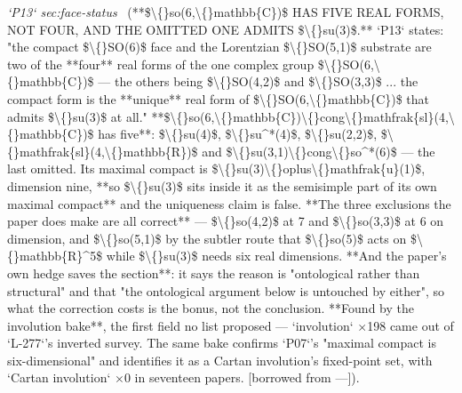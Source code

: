 \begin{description}
\textit{`P13` sec:face-status} \ (**\$\textbackslash\{\}so(6,\textbackslash\{\}mathbb\{C\})\$ HAS FIVE REAL FORMS, NOT FOUR, AND THE OMITTED ONE ADMITS \$\textbackslash\{\}su(3)\$.** `P13` states: "the compact \$\textbackslash\{\}SO(6)\$ face and the Lorentzian \$\textbackslash\{\}SO(5,1)\$ substrate are two of the **four** real forms of the one complex group \$\textbackslash\{\}SO(6,\textbackslash\{\}mathbb\{C\})\$ --- the others being \$\textbackslash\{\}SO(4,2)\$ and \$\textbackslash\{\}SO(3,3)\$ ... the compact form is the **unique** real form of \$\textbackslash\{\}SO(6,\textbackslash\{\}mathbb\{C\})\$ that admits \$\textbackslash\{\}su(3)\$ at all." **\$\textbackslash\{\}so(6,\textbackslash\{\}mathbb\{C\})\textbackslash\{\}cong\textbackslash\{\}mathfrak\{sl\}(4,\textbackslash\{\}mathbb\{C\})\$ has five**: \$\textbackslash\{\}su(4)\$, \$\textbackslash\{\}su\textasciicircum{}*(4)\$, \$\textbackslash\{\}su(2,2)\$, \$\textbackslash\{\}mathfrak\{sl\}(4,\textbackslash\{\}mathbb\{R\})\$ and \$\textbackslash\{\}su(3,1)\textbackslash\{\}cong\textbackslash\{\}so\textasciicircum{}*(6)\$ --- the last omitted. Its maximal compact is \$\textbackslash\{\}su(3)\textbackslash\{\}oplus\textbackslash\{\}mathfrak\{u\}(1)\$, dimension nine, **so \$\textbackslash\{\}su(3)\$ sits inside it as the semisimple part of its own maximal compact** and the uniqueness claim is false. **The three exclusions the paper does make are all correct** --- \$\textbackslash\{\}so(4,2)\$ at 7 and \$\textbackslash\{\}so(3,3)\$ at 6 on dimension, and \$\textbackslash\{\}so(5,1)\$ by the subtler route that \$\textbackslash\{\}so(5)\$ acts on \$\textbackslash\{\}mathbb\{R\}\textasciicircum{}5\$ while \$\textbackslash\{\}su(3)\$ needs six real dimensions. **And the paper's own hedge saves the section**: it says the reason is "ontological rather than structural" and that "the ontological argument below is untouched by either", so what the correction costs is the bonus, not the conclusion. **Found by the involution bake**, the first field no list proposed --- `involution` \ensuremath{\times}198 came out of `L-277`'s inverted survey. The same bake confirms `P07`'s "maximal compact is six-dimensional" and identifies it as a Cartan involution's fixed-point set, with `Cartan involution` \ensuremath{\times}0 in seventeen papers. [borrowed from ---]). 

\end{description}
